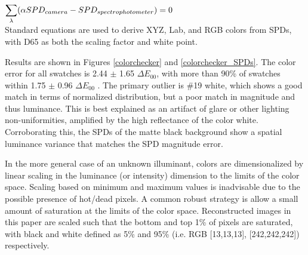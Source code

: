 \documentclass[twocolumn,10pt]{asme2ej}
\newcommand{\id}{\hspace{6 mm}}
\begin{document}
$\mathlarger{ \sum_{\lambda}} ( \alpha SPD_{camera}- SPD_{spectrophotometer} )=0$ \\

Standard equations are used to derive XYZ, Lab, and RGB colors from SPDs, with D65 as both the scaling factor and white point. \cite{Lindbloom}

%
%
%

\id Results are shown in Figures \ref{colorchecker} and \ref{colorchecker_SPDs}. The color error for all swatches is 2.44 $\pm$ 1.65 $\Delta E_{00}$, with more than 90\% of swatches within 1.75 $\pm$ 0.96 $\Delta E_{00}$ . The primary outlier is \#19 white, which shows a good match in terms of normalized distribution, but a poor match in magnitude and thus luminance. This is best explained as an artifact of glare or other lighting non-uniformities, amplified by the high reflectance of the color white. Corroborating this, the SPDs of the matte black background show a spatial luminance variance that matches the SPD magnitude error.

\id In the more general case of an unknown illuminant, colors are dimensionalized by linear scaling in the luminance (or intensity) dimension to the limits of the color space. Scaling based on minimum and maximum values is inadvisable due to the possible presence of hot/dead pixels. A common robust strategy is allow a small amount of saturation at the limits of the color space. Reconstructed images in this paper are scaled such that the bottom and top 1\% of pixels are saturated, with black and white defined as 5\% and 95\% (i.e. RGB [13,13,13], [242,242,242]) respectively.
\end{document}
